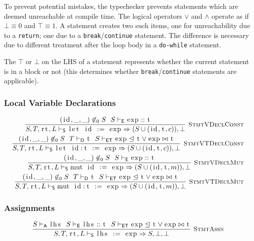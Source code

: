 \documentclass{article}
\newcommand{\code}[1]{\lstinline[columns=fixed]{#1}}
\newcommand{\drmrule}[5]{\frac{#1}{#2\vdash_{\mathsf{#3}}#4}\textsc{\ \small{#5}}}
\newcommand{\ruleapp}[1]{\vdash_{\mathsf{#1}}}
\newcommand{\mc}[1]{\textnormal{\code{#1}}}
\begin{document}
			To prevent potential mistakes, the typechecker prevents statements which are deemed unreachable at compile time. The logical operators $\vee$ and $\wedge$ operate as if $\bot\equiv0$ and $\top\equiv1$. A statement creates two such items, one for unreachability due to a \code{return}; one due to a \code{break}/\code{continue} statement. The difference is necessary due to different treatment after the loop body in a \code{do-while} statement.
			
			The $\top$ or $\bot$ on the LHS of a statement represents whether the current statement is in a block or not (this determines whether \code{break}/\code{continue} statements are applicable).
		
			\subsubsection{Local Variable Declarations}
			
				\begin{align*}
					\drmrule{(\mc{id},\_,\_)\not\in_0 S\ \ S\ruleapp{E}\mc{exp} :: \mc{t}}{S,T,\mc{rt},L}{S}{\mc{let id := exp} \Rightarrow (S \cup (\mc{id},\mc{t},c)),\bot}{StmtVDeclConst}\\
					\drmrule{(\mc{id},\_,\_)\not\in_0 S\ \ T\ruleapp{D}\mc{t}\ \  S\ruleapp{ET}\mc{exp}\trianglelefteq\mc{t}\vee\mc{exp}\bowtie\mc{t}}{S,T,\mc{rt},L}{S}{\mc{let id:t := exp} \Rightarrow (S \cup (\mc{id},\mc{t},c)),\bot}{StmtVTDeclConst}\\
					\drmrule{(\mc{id},\_,\_)\not\in_0 S\ \ S\ruleapp{E}\mc{exp} :: \mc{t}}{S,T,\mc{rt},L}{S}{\mc{mut id := exp} \Rightarrow (S \cup (\mc{id},\mc{t},m)),\bot}{StmtVDeclMut}\\
					\drmrule{(\mc{id},\_,\_)\not\in_0 S\ \ T\ruleapp{D}\mc{t}\ \  S\ruleapp{ET}\mc{exp}\trianglelefteq\mc{t}\vee\mc{exp}\bowtie\mc{t}}{S,T,\mc{rt},L}{S}{\mc{mut id:t := exp} \Rightarrow (S \cup (\mc{id},\mc{t},m)),\bot}{StmtVTDeclMut}
				\end{align*}
			
			\subsubsection{Assignments}
			
				\begin{align*}
					\drmrule{S\ruleapp{A}\mc{lhs}\ \ S\ruleapp{E}\mc{lhs} :: \mc{t}\ \ S\ruleapp{ET}\mc{exp} \trianglelefteq \mc{t} \vee \mc{exp}\bowtie\mc{t}}{S,T,\mc{rt},L}{S}{\mc{lhs := exp} \Rightarrow S,\bot,\bot}{StmtAssn}
				\end{align*}
			
\end{document}
